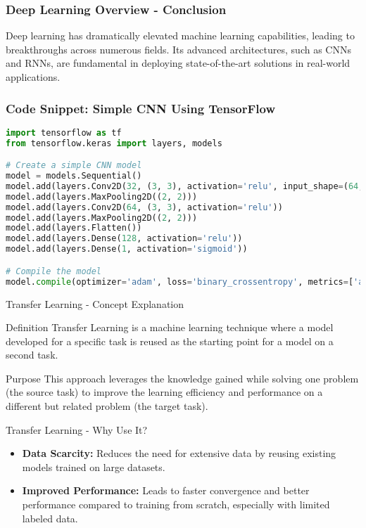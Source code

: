 \documentclass[aspectratio=169]{beamer}
\begin{document}
\begin{frame}[fragile]
    \frametitle{Deep Learning Overview - Conclusion}
    Deep learning has dramatically elevated machine learning capabilities, leading to breakthroughs across numerous fields. Its advanced architectures, such as CNNs and RNNs, are fundamental in deploying state-of-the-art solutions in real-world applications.
\end{frame}

\begin{frame}[fragile]
    \frametitle{Code Snippet: Simple CNN Using TensorFlow}
    \begin{lstlisting}[language=Python]
import tensorflow as tf
from tensorflow.keras import layers, models

# Create a simple CNN model
model = models.Sequential()
model.add(layers.Conv2D(32, (3, 3), activation='relu', input_shape=(64, 64, 3)))
model.add(layers.MaxPooling2D((2, 2)))
model.add(layers.Conv2D(64, (3, 3), activation='relu'))
model.add(layers.MaxPooling2D((2, 2)))
model.add(layers.Flatten())
model.add(layers.Dense(128, activation='relu'))
model.add(layers.Dense(1, activation='sigmoid'))

# Compile the model
model.compile(optimizer='adam', loss='binary_crossentropy', metrics=['accuracy'])
    \end{lstlisting}
\end{frame}

\begin{frame}[fragile]{Transfer Learning - Concept Explanation}
    \begin{block}{Definition}
        Transfer Learning is a machine learning technique where a model developed for a specific task is reused as the starting point for a model on a second task.
    \end{block}
    \begin{block}{Purpose}
        This approach leverages the knowledge gained while solving one problem (the source task) to improve the learning efficiency and performance on a different but related problem (the target task).
    \end{block}
\end{frame}

\begin{frame}[fragile]{Transfer Learning - Why Use It?}
    \begin{itemize}
        \item \textbf{Data Scarcity:} Reduces the need for extensive data by reusing existing models trained on large datasets.
        \item \textbf{Improved Performance:} Leads to faster convergence and better performance compared to training from scratch, especially with limited labeled data.
    \end{itemize}
\end{frame}
\end{document}
